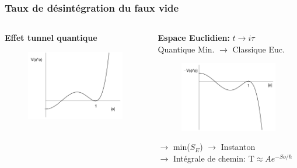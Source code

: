 \documentclass[handout]{beamer}
\newcommand{\Tau}{\mathrm{T}}
\begin{document}
\begin{frame}\frametitle{Taux de désintégration du faux vide}
\begin{columns}[T]
    \begin{column}[T]{.55\linewidth}
   \textbf{Effet tunnel quantique}
        \begin{figure}[.45\linewidth]
    \includegraphics[scale=0.2]{false1.png}
    \end{figure}
 
    \end{column}
    \begin{column}[T]{.45\linewidth}
   \textbf{Espace Euclidien:} $t\rightarrow i\tau$ \\
    Quantique Min. $\rightarrow$ Classique Euc.
       \begin{figure}
    \includegraphics[scale=0.15]{false2.png}
    \end{figure}
 $\rightarrow$ min($S_E$) $\rightarrow$ Instanton
 \\$\rightarrow$ Intégrale de chemin: $ \Tau \approx A e^{-So/\hbar}$    
    \end{column}
\end{columns}
\end{frame}
\end{document}

